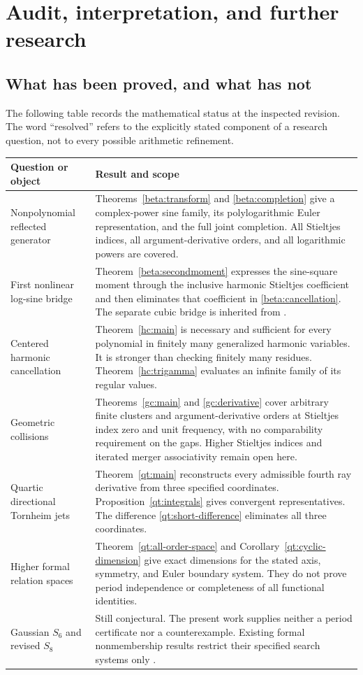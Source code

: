 \section{Audit, interpretation, and further research}
\label{sec:audit}

\subsection{What has been proved, and what has not}

The following table records the mathematical status at the inspected
revision. The word ``resolved'' refers to the explicitly stated component
of a research question, not to every possible arithmetic refinement.

\begin{longtable}{>{\raggedright\arraybackslash}p{}p{}}
\toprule
Question or object & Result and scope\\
\midrule
\endhead
Nonpolynomial reflected generator &
Theorems~\ref{beta:transform} and \ref{beta:completion} give a
complex-power sine family, its polylogarithmic Euler representation, and
the full joint completion. All Stieltjes indices, all argument-derivative
orders, and all logarithmic powers are covered.\\[5pt]
First nonlinear log-sine bridge &
Theorem~\ref{beta:secondmoment} expresses the sine-square moment through
the inclusive harmonic Stieltjes coefficient and then eliminates that
coefficient in \eqref{beta:cancellation}. The separate cubic bridge is
inherited from \cite{RepoCubic}.\\[5pt]
Centered harmonic cancellation &
Theorem~\ref{hc:main} is necessary and sufficient for every polynomial
in finitely many generalized harmonic variables. It is stronger than
checking finitely many residues. Theorem~\ref{hc:trigamma} evaluates an
infinite family of its regular values.\\[5pt]
Geometric collisions &
Theorems~\ref{gc:main} and \ref{gc:derivative} cover arbitrary finite
clusters and argument-derivative orders at Stieltjes index zero and unit
frequency, with no comparability requirement on the gaps. Higher
Stieltjes indices and iterated merger associativity remain open here.\\[5pt]
Quartic directional Tornheim jets &
Theorem~\ref{qt:main} reconstructs every admissible fourth ray derivative
from three specified coordinates. Proposition~\ref{qt:integrals} gives
convergent representatives. The difference \eqref{qt:short-difference}
eliminates all three coordinates.\\[5pt]
Higher formal relation spaces &
Theorem~\ref{qt:all-order-space} and
Corollary~\ref{qt:cyclic-dimension} give exact dimensions for the stated
axis, symmetry, and Euler boundary system. They do not prove period
independence or completeness of all functional identities.\\[5pt]
Gaussian $S_6$ and revised $S_8$ &
Still conjectural. The present work supplies neither a period certificate
nor a counterexample. Existing formal nonmembership results restrict
their specified search systems only \cite{RepoExact}.\\
\bottomrule
\end{longtable}

